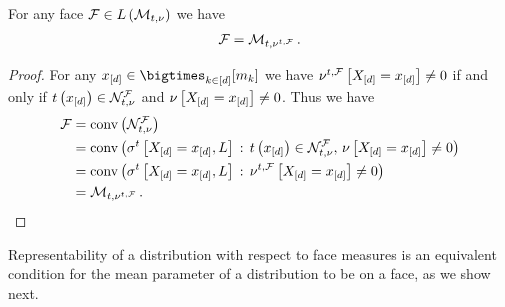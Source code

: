 \begin{lemma}
    \label{lem:faceAsRefinedPolytope}
    For any face $\mathcal{F}\in L\left(\mathcal{M}_{t,\nu}\right)$ we have
    \begin{align*}
        \mathcal{F}
        = \mathcal{M}_{t,\nu^{t,\mathcal{F}}} \, .
    \end{align*}
\end{lemma}
\begin{proof}
    For any $\shortcatindicesin$ we have $\nu^{t,\mathcal{F}}\left[X_{[d]}=x_{[d]}\right]\neq0$ if and only if $t\left(x_{[d]}\right)\in\mathcal{N}_{t,\nu}^{\mathcal{F}}$ and $\nu\left[X_{[d]}=x_{[d]}\right]\neq0$.
    Thus we have
    \begin{align*}
        \mathcal{F}
        &= \mathrm{conv}\left(\mathcal{N}_{t,\nu}^{\mathcal{F}}\right) \\
        &= \mathrm{conv}\left(\sigma^{t}\left[X_{[d]}=x_{[d]},L\right] \,:\, t\left(x_{[d]}\right)\in\mathcal{N}_{t,\nu}^{\mathcal{F}},\, \nu\left[X_{[d]}=x_{[d]}\right]\neq 0\right) \\
        &= \mathrm{conv}\left(\sigma^{t}\left[X_{[d]}=x_{[d]},L\right] \,:\, \nu^{t,\mathcal{F}}\left[X_{[d]}=x_{[d]}\right]\neq 0\right) \\
        &= \mathcal{M}_{t,\nu^{t,\mathcal{F}}} \, . \qedhere
    \end{align*}
\end{proof}

Representability of a distribution with respect to face measures is an equivalent condition for the mean parameter of a distribution to be on a face, as we show next.

